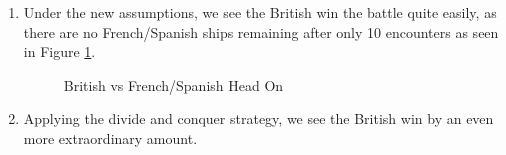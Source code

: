 \documentclass[12pt,letterpaper]{article}
\begin{document}
\begin{enumerate}
\begin{enumerate}
    \item 
    Under the new assumptions, we see the British win the battle quite easily, as 
    there are no French/Spanish ships remaining after only 10 encounters as seen in 
    Figure \ref{fig:1}. 
    \begin{figure}[!htb]
      \caption{\label{fig:1} British vs French/Spanish Head On}
    \end{figure}
    \pagebreak
    \item Applying the divide and conquer strategy, we see the British win by an even more 
    extraordinary amount. 
    \begin{figure}[!htb]

\end{figure}
\end{enumerate}
\end{enumerate}
\end{document}
